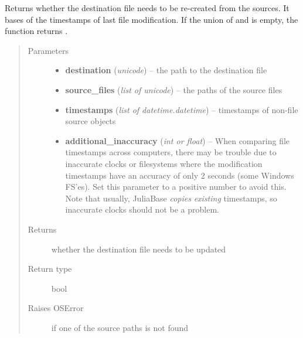 \documentclass[a4paper,11pt,english]{sphinxmanual}
\begin{document}
\begin{fulllineitems}
\label{programming/utilities:jb_common.utils.base.is_update_necessary}
Returns whether the destination file needs to be re-created from the
sources.  It bases of the timestamps of last file modification.  If the
union of  and  is empty, the function returns
.
\begin{quote}\begin{description}
\item[{Parameters}] \leavevmode\begin{itemize}
\item {} 
\textbf{destination} (\emph{unicode}) -- the path to the destination file

\item {} 
\textbf{source\_files} (\emph{list of unicode}) -- the paths of the source files

\item {} 
\textbf{timestamps} (\emph{list of datetime.datetime}) -- timestamps of non-file source objects

\item {} 
\textbf{additional\_inaccuracy} (\emph{int or float}) -- When comparing file timestamps across
computers, there may be trouble due to inaccurate clocks or filesystems
where the modification timestamps have an accuracy of only 2 seconds
(some Windows FS'es).  Set this parameter to a positive number to avoid
this.  Note that usually, JuliaBase \emph{copies} \emph{existing} timestamps, so
inaccurate clocks should not be a problem.

\end{itemize}

\item[{Returns}] \leavevmode
whether the destination file needs to be updated

\item[{Return type}] \leavevmode
bool

\item[{Raises OSError}] \leavevmode
if one of the source paths is not found

\end{description}\end{quote}

\end{fulllineitems}
\end{document}
